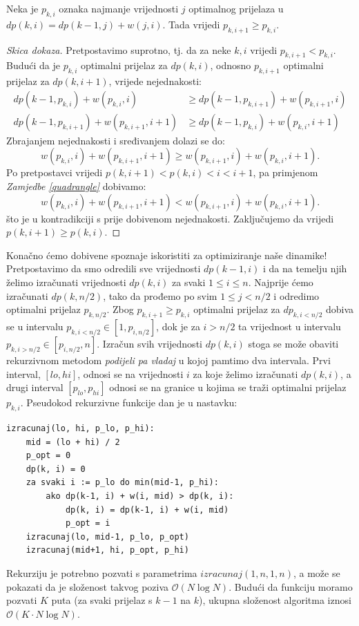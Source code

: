 \begin{zamjedba}
  Neka je $p_{k,i}$ oznaka najmanje vrijednosti $j$ optimalnog prijelaza u
  $dp(k,i) = dp(k-1,j) + w(j, i)$. Tada vrijedi $p_{k,i+1} \ge p_{k,i}$.
\end{zamjedba}

\begin{proof}[Skica dokaza]
  Pretpostavimo suprotno, tj. da za neke $k, i$
  vrijedi $p_{k,i+1} < p_{k,i}$. Budući da je $p_{k,i}$ optimalni prijelaz
  za $dp(k,i)$, odnosno $p_{k,i+1}$ optimalni prijelaz za $dp(k,i+1)$,
  vrijede nejednakosti:
  \begin{equation*}
    \begin{aligned}
      dp(k-1,p_{k,i}) + w(p_{k,i}, i) &\geq dp(k-1,p_{k,i+1}) + w(p_{k,i+1},i) \\
      dp(k-1,p_{k,i+1}) + w(p_{k,i+1},i+1) &\geq dp(k-1,p_{k,i}) + w(p_{k,i},i+1)
    \end{aligned}
  \end{equation*}
  Zbrajanjem nejednakosti i sređivanjem dolazi se do:
  \begin{equation*}
    w(p_{k,i},i) + w(p_{k,i+1},i+1) \geq w(p_{k,i+1},i) + w(p_{k,i},i+1).
  \end{equation*}
  Po pretpostavci vrijedi $p(k,i+1) < p(k,i) < i < i+1$, pa primjenom
  \textit{Zamjedbe \ref{quadrangle}} dobivamo:
  \begin{equation*}
    w(p_{k,i},i) + w(p_{k,i+1},i+1) < w(p_{k,i+1},i) + w(p_{k,i},i+1).
  \end{equation*}
  što je u kontradikciji s prije dobivenom nejednakosti. Zaključujemo
  da vrijedi $p(k,i+1) \geq p(k,i)$.
\end{proof}
 
Konačno ćemo dobivene spoznaje iskoristiti za optimiziranje naše dinamike!
Pretpostavimo da smo odredili sve vrijednosti $dp(k-1,i)$ i da na temelju
njih želimo izračunati vrijednosti $dp(k,i)$ za svaki $1 \le i \le n$.
Najprije ćemo izračunati $dp(k,n/2)$, tako da prođemo po svim $1 \le j < n/2$
i odredimo optimalni prijelaz $p_{k,n/2}$. Zbog $p_{k,i+1} \ge p_{k,i}$ optimalni prijelaz
za $dp_{k,i<n/2}$ dobiva se u intervalu $p_{k,i<n/2} \in [1, p_{i,n/2}]$,
dok je za $i>n/2$ ta vrijednost u intervalu $p_{k,i>n/2} \in [p_{i,n/2},n]$.
Izračun svih vrijednosti $dp(k,i)$ stoga se može obaviti rekurzivnom metodom
\textit{podijeli pa vladaj} u kojoj pamtimo dva intervala. Prvi interval,
$[lo, hi]$, odnosi se na vrijednosti $i$ za koje želimo izračunati $dp(k, i)$,
a drugi interval $[p_{lo}, p_{hi}]$ odnosi se na granice u kojima se traži
optimalni prijelaz $p_{k,i}$. Pseudokod rekurzivne funkcije dan je u nastavku:
\begin{verbatim}
izracunaj(lo, hi, p_lo, p_hi):
    mid = (lo + hi) / 2
    p_opt = 0
    dp(k, i) = 0
    za svaki i := p_lo do min(mid-1, p_hi):
        ako dp(k-1, i) + w(i, mid) > dp(k, i):
            dp(k, i) = dp(k-1, i) + w(i, mid)
            p_opt = i
    izracunaj(lo, mid-1, p_lo, p_opt)
    izracunaj(mid+1, hi, p_opt, p_hi)
\end{verbatim}

Rekurziju je potrebno pozvati s parametrima $izracunaj(1, n, 1, n)$, a može se
pokazati da je složenost takvog poziva $\mathcal{O}(N \log N)$. Budući da funkciju
moramo pozvati $K$ puta (za svaki prijelaz s $k-1$ na $k$), ukupna složenost
algoritma iznosi $\mathcal{O}(K \cdot N \log N)$.




